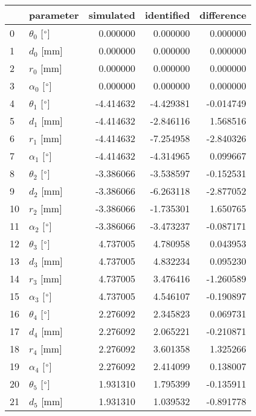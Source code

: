 \documentclass{standalone}%
\begin{document}
%
\normalsize%
\begin{tabular}{llrrr}
\toprule
{} &                 parameter & simulated & identified & difference \\
\midrule
0  &  $\theta_{0}$ [$\degree$] &  0.000000 &   0.000000 &   0.000000 \\
1  &              $d_{0}$ [mm] &  0.000000 &   0.000000 &   0.000000 \\
2  &              $r_{0}$ [mm] &  0.000000 &   0.000000 &   0.000000 \\
3  &  $\alpha_{0}$ [$\degree$] &  0.000000 &   0.000000 &   0.000000 \\
4  &  $\theta_{1}$ [$\degree$] & -4.414632 &  -4.429381 &  -0.014749 \\
5  &              $d_{1}$ [mm] & -4.414632 &  -2.846116 &   1.568516 \\
6  &              $r_{1}$ [mm] & -4.414632 &  -7.254958 &  -2.840326 \\
7  &  $\alpha_{1}$ [$\degree$] & -4.414632 &  -4.314965 &   0.099667 \\
8  &  $\theta_{2}$ [$\degree$] & -3.386066 &  -3.538597 &  -0.152531 \\
9  &              $d_{2}$ [mm] & -3.386066 &  -6.263118 &  -2.877052 \\
10 &              $r_{2}$ [mm] & -3.386066 &  -1.735301 &   1.650765 \\
11 &  $\alpha_{2}$ [$\degree$] & -3.386066 &  -3.473237 &  -0.087171 \\
12 &  $\theta_{3}$ [$\degree$] &  4.737005 &   4.780958 &   0.043953 \\
13 &              $d_{3}$ [mm] &  4.737005 &   4.832234 &   0.095230 \\
14 &              $r_{3}$ [mm] &  4.737005 &   3.476416 &  -1.260589 \\
15 &  $\alpha_{3}$ [$\degree$] &  4.737005 &   4.546107 &  -0.190897 \\
16 &  $\theta_{4}$ [$\degree$] &  2.276092 &   2.345823 &   0.069731 \\
17 &              $d_{4}$ [mm] &  2.276092 &   2.065221 &  -0.210871 \\
18 &              $r_{4}$ [mm] &  2.276092 &   3.601358 &   1.325266 \\
19 &  $\alpha_{4}$ [$\degree$] &  2.276092 &   2.414099 &   0.138007 \\
20 &  $\theta_{5}$ [$\degree$] &  1.931310 &   1.795399 &  -0.135911 \\
21 &              $d_{5}$ [mm] &  1.931310 &   1.039532 &  -0.891778 \\

\end{tabular}
\end{document}
